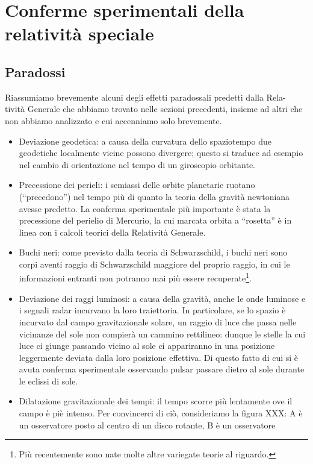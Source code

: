 \chapter{Conferme sperimentali della relatività speciale}
\minitoc

\section{Paradossi}
Riassumiamo brevemente alcuni degli effetti paradossali predetti dalla Rela-
tività Generale che abbiamo trovato nelle sezioni precedenti, insieme ad altri
che non abbiamo analizzato e cui accenniamo solo brevemente.

\begin{itemize}
 \item Deviazione geodetica: a causa della curvatura dello spaziotempo due
geodetiche localmente vicine possono divergere; questo si traduce ad
esempio nel cambio di orientazione nel tempo di un giroscopio orbitante.
 \item Precessione dei perieli: i semiassi delle orbite planetarie ruotano
(``precedono'') nel tempo più di quanto la teoria della gravità newtoniana 
avesse predetto. La conferma sperimentale più importante è stata la precessione 
del perielio di Mercurio, la cui marcata orbita a ``rosetta'' è 
in linea con i calcoli teorici della Relatività Generale.
 \item Buchi neri: come previsto dalla teoria di Schwarzschild, i buchi neri
sono corpi aventi raggio di Schwarzschild maggiore del proprio raggio,
in cui le informazioni entranti non potranno mai più essere recuperate\footnote{
Più recentemente sono nate molte altre variegate teorie al riguardo.}.
 \item Deviazione dei raggi luminosi: a causa della gravità, anche le onde
luminose e i segnali radar incurvano la loro traiettoria. In particolare,
se lo spazio è incurvato dal campo gravitazionale solare, un raggio di
luce che passa nelle vicinanze del sole non compierà un cammino rettilineo: 
dunque le stelle la cui luce ci giunge passando vicino al sole
ci appariranno in una posizione leggermente deviata dalla loro posizione 
effettiva. Di questo fatto di cui si è avuta conferma sperimentale
osservando pulsar passare dietro al sole durante le eclissi di sole.
 \item Dilatazione gravitazionale dei tempi: il tempo scorre più lentamente 
ove il campo è piè intenso.
Per convincerci di ciò, consideriamo la figura XXX: A è un osservatore 
posto al centro di un disco rotante, B è un osservatore

\end{itemize}
